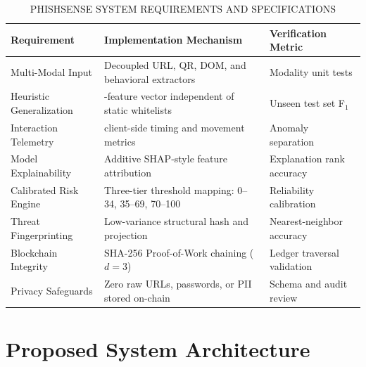 \documentclass[conference]{IEEEtran}
\begin{document}
\begin{table}[!t]
\caption{PHISHSENSE SYSTEM REQUIREMENTS AND SPECIFICATIONS}
\label{tab:req}
\centering
\scriptsize
\setlength{\tabcolsep}{3pt}
\begin{tabularx}{\columnwidth}{|>{\raggedright\arraybackslash}p{}|>{\raggedright\arraybackslash}X|>{\raggedright\arraybackslash}p{}|}
\hline
\textbf{Requirement} & \textbf{Implementation Mechanism} & \textbf{Verification Metric} \\ \hline
Multi-Modal Input      & Decoupled URL, QR, DOM, and behavioral extractors & Modality unit tests \\ \hline
Heuristic Generalization & 47-feature vector independent of static whitelists & Unseen test set F$_1$ \\ \hline
Interaction Telemetry  & 13 client-side timing and movement metrics & Anomaly separation \\ \hline
Model Explainability   & Additive SHAP-style feature attribution & Explanation rank accuracy \\ \hline
Calibrated Risk Engine & Three-tier threshold mapping: 0--34, 35--69, 70--100 & Reliability calibration \\ \hline
Threat Fingerprinting  & Low-variance structural hash and projection & Nearest-neighbor accuracy \\ \hline
Blockchain Integrity   & SHA-256 Proof-of-Work chaining ($d=3$) & Ledger traversal validation \\ \hline
Privacy Safeguards     & Zero raw URLs, passwords, or PII stored on-chain & Schema and audit review \\ \hline
\end{tabularx}
\end{table}

\section{Proposed System Architecture}
\end{document}
